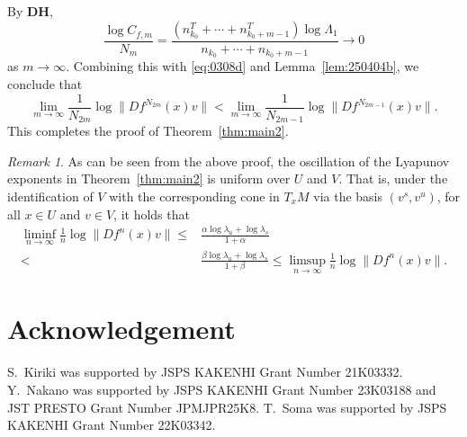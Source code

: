 \documentclass{amsart}
\theoremstyle{plain}
\theoremstyle{definition}
\theoremstyle{remark}
\newtheorem{remark}[thm]{Remark}
\numberwithin{equation}{section}
\begin{document}
By {\bf DH},
\[
\frac{\log C_{f,m}}{N_m}
=
\frac{(n_{k_0}^T+\cdots+n_{k_0+m-1}^T)\log\Lambda_1}{n_{k_0}+\cdots+n_{k_0+m-1}}
\to 0
\]
as $m\to\infty$.
Combining this with \eqref{eq:0308d} and Lemma~\ref{lem:250404b}, we conclude that
\[
\lim_{m\to\infty}\frac{1}{N_{2m}}\log \|Df^{N_{2m}}(x)v\|
<
\lim_{m\to\infty}\frac{1}{N_{2m-1}}\log \|Df^{N_{2m-1}}(x)v\|.
\]
This completes the proof of Theorem~\ref{thm:main2}.
\begin{remark}
As can be seen from the above proof, the oscillation of the Lyapunov exponents in Theorem~\ref{thm:main2} is uniform over $U$ and $V$.
That is, under the identification of $V$ with the corresponding cone in $T_xM$ via the basis $(v^s,v^u)$, for all $x\in U$ and $v\in V$, it holds that
\begin{align*}
\liminf_{n\to\infty}\frac{1}{n}\log\|Df^n(x)v\| \le &\frac{\alpha\log\lambda_u+\log\lambda_s}{1+\alpha}\\
<&
\frac{\beta\log\lambda_u+\log\lambda_s}{1+\beta} \le \limsup_{n\to\infty}\frac{1}{n}\log\|Df^n(x)v\|.
\end{align*}
\end{remark}









\section*{Acknowledgement}
S.~Kiriki was supported by JSPS KAKENHI Grant Number 21K03332.
Y.~Nakano was supported by JSPS KAKENHI Grant  Number 23K03188 and JST PRESTO Grant Number JPMJPR25K8.
T.~Soma was supported by JSPS KAKENHI Grant Number 22K03342.


%
%


\end{document}
